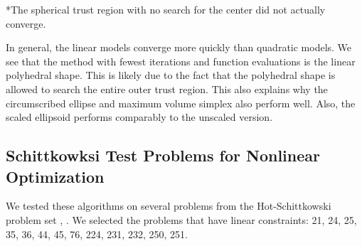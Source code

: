 \begin{center}
\begin{tabular}{ c c c c c c c c }

\end{tabular}
\end{center}

*The spherical trust region with no search for the center did not actually converge.

In general, the linear models converge more quickly than quadratic models.
We see that the method with fewest iterations and function evaluations is the linear polyhedral shape.
This is likely due to the fact that the polyhedral shape is allowed to search the entire outer trust region.
This also explains why the circumscribed ellipse and maximum volume simplex also perform well.
Also, the scaled ellipsoid performs comparably to the unscaled version.

\subsection{Schittkowksi Test Problems for Nonlinear Optimization}


We tested these algorithms on several problems from the Hot-Schittkowski problem set \cite{Schittkowski:1987:MTE:27135}, \cite{Hock1980}.
We selected the problems that have linear constraints: 21, 24, 25, 35, 36, 44, 45, 76, 224, 231, 232, 250, 251.


